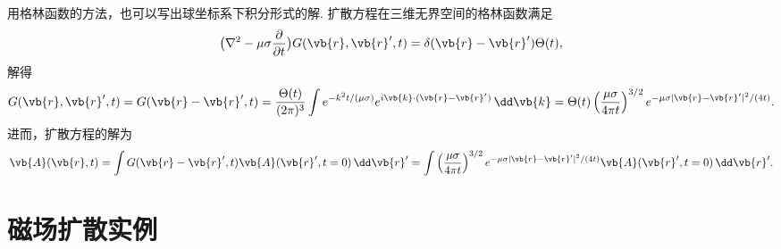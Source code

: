 \begin{note}
	用格林函数的方法，也可以写出球坐标系下积分形式的解.
	扩散方程在三维无界空间的格林函数满足
	\begin{align*}
		\bigl(\nabla^2 - \mu\sigma \frac{\partial}{\partial t}\bigr) G(\vb{r},\vb{r}',t) = \delta(\vb{r} - \vb{r}') \Theta(t),
	\end{align*}
	解得
	\begin{align*}
		G(\vb{r},\vb{r}',t) = G(\vb{r} - \vb{r}',t)
		= \frac{\Theta(t)}{(2\pi)^3} \int e^{-k^2 t/(\mu\sigma)} e^{i\vb{k}\cdot(\vb{r} - \vb{r}')} \,\dd \vb{k}
		= \Theta(t) \left(\frac{\mu\sigma}{4\pi t}\right)^{3/2} e^{-\mu\sigma |\vb{r} - \vb{r}'|^2/(4t)}.
	\end{align*}
	进而，扩散方程的解为
	\begin{align*}
		\vb{A}(\vb{r},t) = \int G(\vb{r} - \vb{r}',t) \vb{A}(\vb{r}',t=0) \,\dd \vb{r}'
		= \int \left(\frac{\mu\sigma}{4\pi t}\right)^{3/2} e^{-\mu\sigma |\vb{r} - \vb{r}'|^2/(4t)} \vb{A}(\vb{r}',t=0) \,\dd \vb{r}'.
	\end{align*}
\end{note}

\section{磁场扩散实例}

